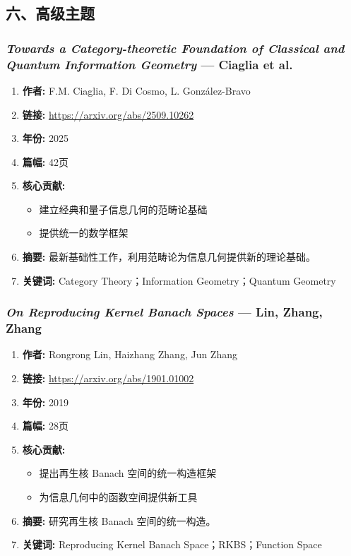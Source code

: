 \subsection{六、高级主题}

\subsubsection{\textbf{\textit{Towards a Category-theoretic Foundation of Classical and Quantum Information Geometry}} — Ciaglia et al.}
\begin{enumerate}
    \item \textbf{作者:} F.M. Ciaglia, F. Di Cosmo, L. González-Bravo
    \item \textbf{链接:} \url{https://arxiv.org/abs/2509.10262}
    \item \textbf{年份:} 2025
    \item \textbf{篇幅:} 42页
    \item \textbf{核心贡献:}
        \begin{itemize}
            \item 建立经典和量子信息几何的范畴论基础
            \item 提供统一的数学框架
        \end{itemize}
    \item \textbf{摘要:} 最新基础性工作，利用范畴论为信息几何提供新的理论基础。
    \item \textbf{关键词:} Category Theory；Information Geometry；Quantum Geometry
\end{enumerate}

\subsubsection{\textbf{\textit{On Reproducing Kernel Banach Spaces}} — Lin, Zhang, Zhang}
\begin{enumerate}
    \item \textbf{作者:} Rongrong Lin, Haizhang Zhang, Jun Zhang
    \item \textbf{链接:} \url{https://arxiv.org/abs/1901.01002}
    \item \textbf{年份:} 2019
    \item \textbf{篇幅:} 28页
    \item \textbf{核心贡献:}
        \begin{itemize}
            \item 提出再生核 Banach 空间的统一构造框架
            \item 为信息几何中的函数空间提供新工具
        \end{itemize}
    \item \textbf{摘要:} 研究再生核 Banach 空间的统一构造。
    \item \textbf{关键词:} Reproducing Kernel Banach Space；RKBS；Function Space
\end{enumerate}

